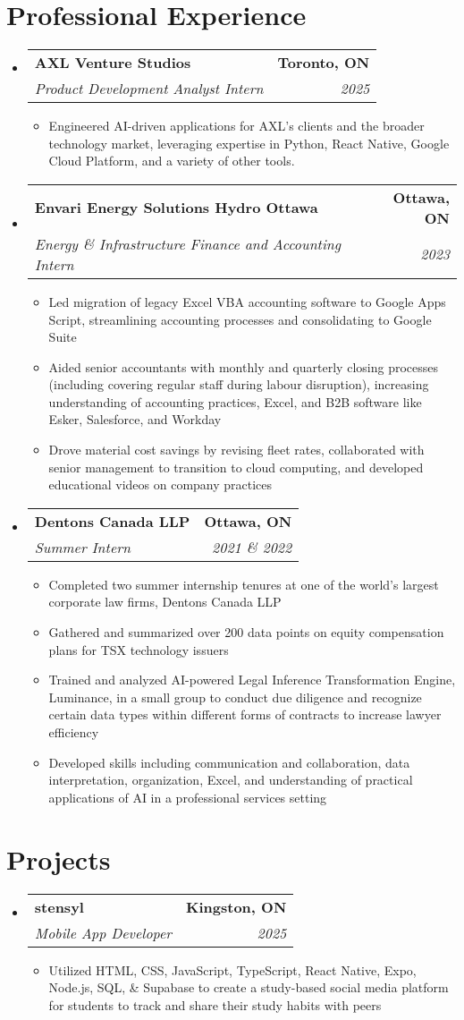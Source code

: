 \documentclass[letterpaper,10pt]{article}
\makeatletter
\newcommand{\resumeItem}[1]{
  \item\small{
    {#1 \vspace{-2pt}}
  }
}
\newcommand{\resumeSubheading}[4]{
  \vspace{-2pt}\item
    \begin{tabular*}{1.0\textwidth}[t]{l@{\extracolsep{\fill}}r}
      \textbf{#1} & \textbf{\small #2} \\
      \textit{\small#3} & \textit{\small #4} \\
    \end{tabular*}\vspace{-7pt}
}
\newcommand{\resumeSubHeadingListStart}{\begin{itemize}[leftmargin=0.0in, label={}]}
\newcommand{\resumeSubHeadingListEnd}{\end{itemize}}
\newcommand{\resumeItemListStart}{\begin{itemize}[label=--]}
\newcommand{\resumeItemListEnd}{\end{itemize}\vspace{-5pt}}
\makeatother
\begin{document}
\section{Professional Experience}
  \resumeSubHeadingListStart
    \resumeSubheading
      {AXL Venture Studios}{Toronto, ON}
      {Product Development Analyst Intern}{2025}
      \resumeItemListStart
        \resumeItem{Engineered AI-driven applications for AXL's clients and the broader technology market, leveraging expertise in Python, React Native, Google Cloud Platform, and a variety of other tools.}
      \resumeItemListEnd
    \resumeSubheading
      {Envari Energy Solutions \textbar{} Hydro Ottawa}{Ottawa, ON}
      {Energy \& Infrastructure Finance and Accounting Intern}{2023}
      \resumeItemListStart
        \resumeItem{Led migration of legacy Excel VBA accounting software to Google Apps Script, streamlining accounting processes and consolidating to Google Suite}
        \resumeItem{Aided senior accountants with monthly and quarterly closing processes (including covering regular staff during labour disruption), increasing understanding of accounting practices, Excel, and B2B software like Esker, Salesforce, and Workday}
        \resumeItem{Drove material cost savings by revising fleet rates, collaborated with senior management to transition to cloud computing, and developed educational videos on company practices}
      \resumeItemListEnd
    \resumeSubheading
      {Dentons Canada LLP}{Ottawa, ON}
      {Summer Intern}{2021 \& 2022}
      \resumeItemListStart
        \resumeItem{Completed two summer internship tenures at one of the world's largest corporate law firms, Dentons Canada LLP}
        \resumeItem{Gathered and summarized over 200 data points on equity compensation plans for TSX technology issuers}
        \resumeItem{Trained and analyzed AI-powered Legal Inference Transformation Engine, Luminance, in a small group to conduct due diligence and recognize certain data types within different forms of contracts to increase lawyer efficiency}
        \resumeItem{Developed skills including communication and collaboration, data interpretation, organization, Excel, and understanding of practical applications of AI in a professional services setting}
      \resumeItemListEnd
  \resumeSubHeadingListEnd

\section{Projects}
    \resumeSubHeadingListStart
      \resumeSubheading
          {stensyl}{Kingston, ON}
          {Mobile App Developer}{2025}
          \resumeItemListStart
            \resumeItem{Utilized HTML, CSS, JavaScript, TypeScript, React Native, Expo, Node.js, SQL, \& Supabase to create a study-based social media platform for students to track and share their study habits with peers}
          \resumeItemListEnd
    \resumeSubHeadingListEnd
\end{document}
